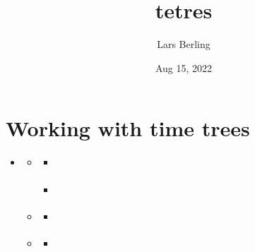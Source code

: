 \documentclass[letterpaper,10pt,english]{sphinxmanual}
\title{tetres}
\date{Aug 15, 2022}
\author{Lars Berling}
\begin{document}
\pagestyle{empty}
\sphinxmaketitle
\pagestyle{plain}
\sphinxtableofcontents
\pagestyle{normal}
\label{\detokenize{index::doc}}



\chapter{Working with time trees}
\label{\detokenize{trees:working-with-time-trees}}\label{\detokenize{trees::doc}}
\begin{sphinxShadowBox}
\begin{itemize}
\item {} 
\sphinxAtStartPar
{}\label{\detokenize{trees:id3}}{\hyperref[\detokenize{trees:working-with-time-trees}]{}}
\begin{itemize}
\item {} 
\sphinxAtStartPar
{}\label{\detokenize{trees:id4}}{\hyperref[\detokenize{trees:the-timetree-class}]{}}
\begin{itemize}
\item {} 
\sphinxAtStartPar
{}\label{\detokenize{trees:id5}}{\hyperref[\detokenize{trees:timetree-attributes}]{}}

\item {} 
\sphinxAtStartPar
{}\label{\detokenize{trees:id6}}{\hyperref[\detokenize{trees:ete3-functionalities}]{}}

\end{itemize}

\item {} 
\sphinxAtStartPar
{}\label{\detokenize{trees:id7}}{\hyperref[\detokenize{trees:the-timetreeset-class}]{}}
\begin{itemize}
\item {} 
\sphinxAtStartPar
{}\label{\detokenize{trees:id8}}{\hyperref[\detokenize{trees:reading-trees}]{}}

\end{itemize}

\item {} 
\sphinxAtStartPar
{}\label{\detokenize{trees:id9}}{\hyperref[\detokenize{trees:general-functions}]{}}
\begin{itemize}
\item {} 
\sphinxAtStartPar
{}\label{\detokenize{trees:id10}}{\hyperref[\detokenize{trees:working-with-findpath-path-and-c-memory}]{}}


\end{itemize}
\end{itemize}
\end{itemize}
\end{sphinxShadowBox}
\end{document}
